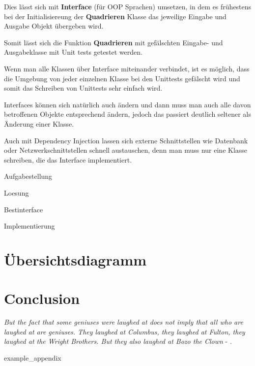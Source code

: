 \documentclass{article}
\begin{document}
    Dies lässt sich mit \textbf{Interface} (für OOP Sprachen) umsetzen, 
    in dem es frühestens bei der Initialisiereung der \textbf{Quadrieren} 
    Klasse das jeweilige Eingabe und Ausgabe Objekt übergeben wird.

    Somit lässt sich die Funktion \textbf{Quadrieren} mit gefälschten Eingabe- und Ausgabeklasse mit Unit tests getestet werden.

    Wenn man alle Klassen über Interface miteinander verbindet, 
    ist es möglich, dass die Umgebung von jeder einzelnen Klasse bei den Unittests gefälscht
    wird und somit das Schreiben von Unittests sehr einfach wird. 

    Interfaces können sich natürlich auch ändern und dann muss man auch alle davon betroffenen Objekte entsprechend ändern, 
    jedoch das passiert deutlich seltener als Änderung einer Klasse.

    Auch mit Dependency Injection lassen sich externe Schnittstellen wie Datenbank oder Netzwerkschnittstellen schnell austauschen, 
    denn man muss nur eine Klasse schreiben, die das Interface implementiert.
\newpage



{Aufgabestellung}

{Loesung}


\newpage
{Bestinterface}

\newpage
{Implementierung}

\section{Übersichtsdiagramm}

\section{Conclusion}
\textit{But the fact that some geniuses were laughed at does not imply that all who are laughed at are geniuses. They laughed at Columbus, they laughed at Fulton, they laughed at the Wright Brothers. But they also laughed at Bozo the Clown} -  \textcite{sagan_1993}.

\newpage
\printbibliography[heading = bibintoc, title = Bibliography]    %

\addappendix
{example_appendix}

\end{document}
